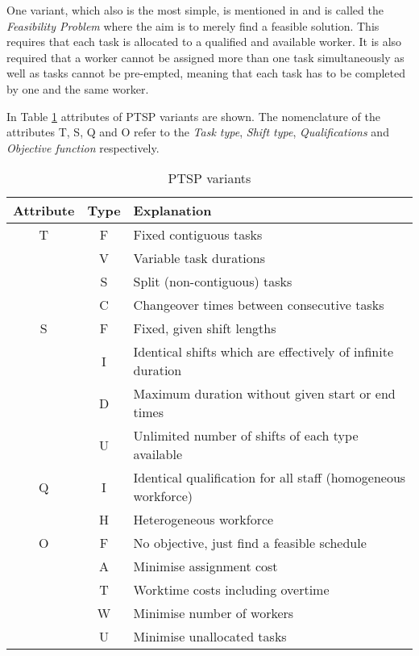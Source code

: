 One variant, which also is the most simple, is mentioned in \citet{krishnamoorthy_2001} and is called the \textit{Feasibility Problem} where the aim is to merely find a feasible solution. This requires that each task is allocated to a qualified and available worker. It is also required that a worker cannot be assigned more than one task simultaneously as well as tasks cannot be pre-empted, meaning that each task has to be completed by one and the same worker.

In Table \ref{tab:PTSP} attributes of PTSP variants are shown. The nomenclature of the attributes T, S, Q and O refer to the \textit{Task type}, \textit{Shift type}, \textit{Qualifications} and \textit{Objective function} respectively. 
\begin{table}[H]
\caption{PTSP variants}
\label{tab:PTSP}
\begin{tabular}{|c|c|l|}
\hline
\textbf{Attribute} & \textbf{Type} & \textbf{Explanation} \\ \hline
T & F & Fixed contiguous tasks \\
& V & Variable task durations \\
& S & Split (non-contiguous) tasks \\
& C & Changeover times between consecutive tasks \\
\hline 
S & F & Fixed, given shift lengths \\
& I & Identical shifts which are effectively of infinite duration \\
& D & Maximum duration without given start or end times \\
& U & Unlimited number of shifts of each type available \\
\hline 
Q & I & Identical qualification for all staff (homogeneous workforce) \\
& H & Heterogeneous workforce \\
\hline 
O & F & No objective, just find a feasible schedule \\
& A & Minimise assignment cost \\
& T & Worktime costs including overtime \\
& W & Minimise number of workers \\
& U & Minimise unallocated tasks \\
\hline  

\end{tabular}
\end{table}

